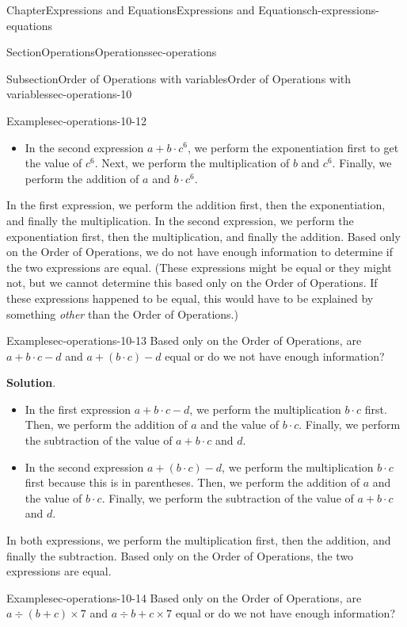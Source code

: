 \documentclass[twoside,11pt,]{book}
\newcommand{\blocktitlefont}{\relax}
\numberwithin{equation}{chapter}
\begin{document}
\begin{chapterptx}{Chapter}{Expressions and Equations}{}{Expressions and Equations}{}{}{ch-expressions-equations}
\begin{sectionptx}{Section}{Operations}{}{Operations}{}{}{sec-operations}
\begin{subsectionptx}{Subsection}{Order of Operations with variables}{}{Order of Operations with variables}{}{}{sec-operations-10}
\begin{example}{Example}{}{sec-operations-10-12}
\begin{itemize}[label=\textbullet]
\item{}In the second expression \(a + b \cdot c^6\), we perform the exponentiation first to get the value of \(c^6\). Next, we perform the multiplication of \(b\) and \(c^6\). Finally, we perform the addition of \(a\) and \(b \cdot c^6\).%
\end{itemize}
In the first expression, we perform the addition first, then the exponentiation, and finally the multiplication. In the second expression, we perform the exponentiation first, then the multiplication, and finally the addition. Based only on the Order of Operations, we do not have enough information to determine if the two expressions are equal. (These expressions might be equal or they might not, but we cannot determine this based only on the Order of Operations. If these expressions happened to be equal, this would have to be explained by something \emph{other} than the Order of Operations.)%
\end{example}
\begin{example}{Example}{}{sec-operations-10-13}%
Based only on the Order of Operations, are \(a + b \cdot c - d\) and \(a + (b \cdot c) - d\) equal or do we not have enough information?%
\par\smallskip%
\noindent\textbf{\blocktitlefont Solution}.\hypertarget{sec-operations-10-13-2}{}\quad{}%
\begin{itemize}[label=\textbullet]
\item{}In the first expression \(a + b \cdot c - d\), we perform the multiplication \(b \cdot c\) first. Then, we perform the addition of \(a\) and the value of \(b \cdot c\). Finally, we perform the subtraction of the value of \(a + b \cdot c\) and \(d\).%
\item{}In the second expression \(a + (b \cdot c) - d\), we perform the multiplication \(b \cdot c\) first because this is in parentheses. Then, we perform the addition of \(a\) and the value of \(b \cdot c\). Finally, we perform the subtraction of the value of \(a + b \cdot c\) and \(d\).%
\end{itemize}
In both expressions, we perform the multiplication first, then the addition, and finally the subtraction. Based only on the Order of Operations, the two expressions are equal.%
\end{example}
\begin{example}{Example}{}{sec-operations-10-14}%
Based only on the Order of Operations, are \(a \div (b+c) \times 7\) and \(a \div b + c \times 7\) equal or do we not have enough information?%
\par\smallskip%

\end{example}
\end{subsectionptx}
\end{sectionptx}
\end{chapterptx}
\end{document}

